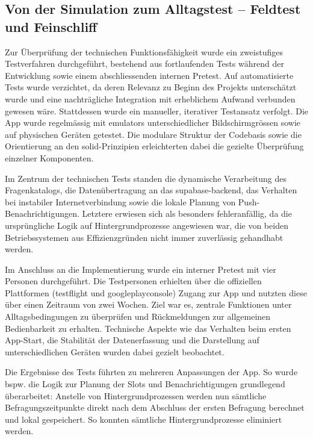 \subsection{Von der Simulation zum Alltagstest – Feldtest und Feinschliff}
\label{sec:app_entwicklung_feldtest}

Zur Überprüfung der technischen Funktionsfähigkeit wurde ein zweistufiges Testverfahren durchgeführt, bestehend aus fortlaufenden Tests während der Entwicklung sowie einem abschliessenden internen Pretest. Auf automatisierte Tests wurde verzichtet, da deren Relevanz zu Beginn des Projekts unterschätzt wurde und eine nachträgliche Integration mit erheblichem Aufwand verbunden gewesen wäre. Stattdessen wurde ein manueller, iterativer Testansatz verfolgt. Die App wurde regelmässig mit \glspl{emulator} unterschiedlicher Bildschirmgrössen sowie auf physischen Geräten getestet. Die modulare Struktur der Codebasis sowie die Orientierung an den \gls{solid}-Prinzipien erleichterten dabei die gezielte Überprüfung einzelner Komponenten.

Im Zentrum der technischen Tests standen die dynamische Verarbeitung des Fragenkatalogs, die Datenübertragung an das \gls{supabase}-\gls{backend}, das Verhalten bei instabiler Internetverbindung sowie die lokale Planung von Push-Benachrichtigungen. Letztere erwiesen sich als besonders fehleranfällig, da die ursprüngliche Logik auf Hintergrundprozesse angewiesen war, die von beiden Betriebssystemen aus Effizienzgründen nicht immer zuverlässig gehandhabt werden.

Im Anschluss an die Implementierung wurde ein interner Pretest mit vier Personen durchgeführt. Die Testpersonen erhielten über die offiziellen Plattformen (\gls{testflight} und \gls{googleplayconsole}) Zugang zur App und nutzten diese über einen Zeitraum von zwei Wochen. Ziel war es, zentrale Funktionen unter Alltagsbedingungen zu überprüfen und Rückmeldungen zur allgemeinen Bedienbarkeit zu erhalten. Technische Aspekte wie das Verhalten beim ersten App-Start, die Stabilität der Datenerfassung und die Darstellung auf unterschiedlichen Geräten wurden dabei gezielt beobachtet.

Die Ergebnisse des Tests führten zu mehreren Anpassungen der App. So wurde bspw. die Logik zur Planung der Slots und Benachrichtigungen grundlegend überarbeitet: Anstelle von Hintergrundprozessen werden nun sämtliche Befragungszeitpunkte direkt nach dem Abschluss der ersten Befragung berechnet und lokal gespeichert. So konnten sämtliche Hintergrundprozesse eliminiert werden.

